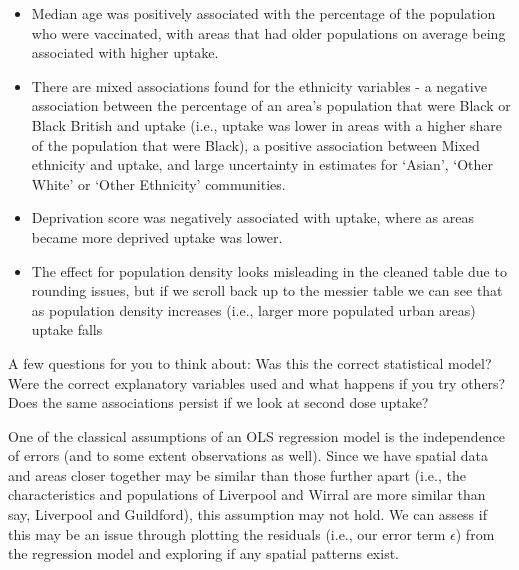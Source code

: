 \documentclass[
]{book}
\providecommand{\tightlist}{%
  \setlength{\itemsep}{0pt}\setlength{\parskip}{0pt}}
\begin{document}
\begin{itemize}
\tightlist
\item
  Median age was positively associated with the percentage of the population who were vaccinated, with areas that had older populations on average being associated with higher uptake.
\item
  There are mixed associations found for the ethnicity variables - a negative association between the percentage of an area's population that were Black or Black British and uptake (i.e., uptake was lower in areas with a higher share of the population that were Black), a positive association between Mixed ethnicity and uptake, and large uncertainty in estimates for `Asian', `Other White' or `Other Ethnicity' communities.
\item
  Deprivation score was negatively associated with uptake, where as areas became more deprived uptake was lower.
\item
  The effect for population density looks misleading in the cleaned table due to rounding issues, but if we scroll back up to the messier table we can see that as population density increases (i.e., larger more populated urban areas) uptake falls
\end{itemize}

A few questions for you to think about: Was this the correct statistical model? Were the correct explanatory variables used and what happens if you try others? Does the same associations persist if we look at second dose uptake?

One of the classical assumptions of an OLS regression model is the independence of errors (and to some extent observations as well). Since we have spatial data and areas closer together may be similar than those further apart (i.e., the characteristics and populations of Liverpool and Wirral are more similar than say, Liverpool and Guildford), this assumption may not hold. We can assess if this may be an issue through plotting the residuals (i.e., our error term \(\epsilon\)) from the regression model and exploring if any spatial patterns exist.
\end{document}
